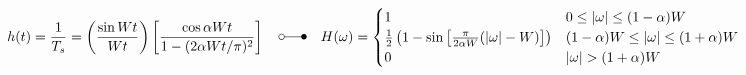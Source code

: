$$ 
h(t) = \frac{1}{T_s} = \left( \frac{\sin{W t}}{W t} \right) \left[ \frac{\cos{\alpha W t}}{1
- (2 \alpha W t / \pi)^2}\right]
\quad \laplace \quad
H(\omega) = \begin{cases}
	1 			
		&  	0 \leq | \omega | \leq (1-\alpha) W       \\
	\frac{1}{2} \left( 1 - \sin\left[ \frac{\pi}{2 \alpha W} (| \omega | - W)\right] \right)      
		&	(1-\alpha) W \leq | \omega | \leq (1+\alpha) W       \\
	0
		& 	| \omega | > (1+\alpha) W
            \end{cases}
$$


% 


